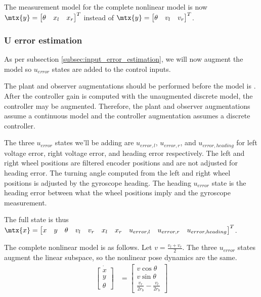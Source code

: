 The measurement model for the complete nonlinear model is now
$\mtx{y} = \begin{bmatrix}\theta & x_l & x_r\end{bmatrix}^T$ instead of
$\mtx{y} = \begin{bmatrix}\theta & v_l & v_r\end{bmatrix}^T$.

\subsubsection{U error estimation}

As per subsection \ref{subsec:input_error_estimation}, we will now augment the
\gls{model} so $u_{error}$ states are added to the \glspl{control input}.

The \gls{plant} and \gls{observer} augmentations should be performed before the
\gls{model} is . After the \gls{controller}
gain is computed with the unaugmented discrete \gls{model}, the controller may
be augmented. Therefore, the \gls{plant} and \gls{observer} augmentations assume
a continuous \gls{model} and the \gls{controller} augmentation assumes a
discrete \gls{controller}.

The three $u_{error}$ states we'll be adding are $u_{error,l}$, $u_{error,r}$,
and $u_{error,heading}$ for left voltage error, right voltage error, and heading
error respectively. The left and right wheel positions are filtered encoder
positions and are not adjusted for heading error. The turning angle computed
from the left and right wheel positions is adjusted by the gyroscope heading.
The heading $u_{error}$ state is the heading error between what the wheel
positions imply and the gyroscope measurement.

The full state is thus
$\mtx{x} = \begin{bmatrix}x & y & \theta & v_l & v_r & x_l & x_r & u_{error,l} &
  u_{error,r} & u_{error,heading}\end{bmatrix}^T$.

The complete nonlinear model is as follows. Let $v = \frac{v_l + v_r}{2}$. The
three $u_{error}$ states augment the linear subspace, so the nonlinear pose
dynamics are the same.
\begin{align}
  \dot{\begin{bmatrix}
    x \\
    y \\
    \theta
  \end{bmatrix}} &=
    \begin{bmatrix}
      v\cos\theta \\
      v\sin\theta \\
      \frac{v_r}{2r_b} - \frac{v_l}{2r_b}
    \end{bmatrix}
\end{align}

